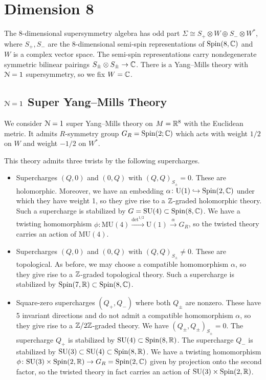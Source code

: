 \documentclass[10pt, oneside]{article}
\newcommand{\MU}{\mathrm{MU}}
\renewcommand{\U}{\mathrm{U}}
\begin{document}
\section{Dimension 8}

The 8-dimensional supersymmetry algebra has odd part $\Sigma\cong S_+\otimes W\oplus S_-\otimes W^*$, where $S_+, S_-$ are the 8-dimensional semi-spin representations of $\mathrm{Spin}(8, \mathbb C)$ and $W$ is a complex vector space. The semi-spin representations carry nondegenerate symmetric bilinear pairings $S_{\pm}\otimes S_{\pm}\rightarrow \mathbb C$. There is a Yang--Mills theory with $\mathcal{N}=1$ supersymmetry, so we fix $W = \mathbb C$.

\subsection{\texorpdfstring{$\mathcal N=1$}{N=1} Super Yang--Mills Theory}

We consider $\mathcal N=1$ super Yang--Mills theory on $M=\mathbb R^8$ with the Euclidean metric. It admits $R$-symmetry group $G_R=\mathrm{Spin}(2; \mathbb C)$ which acts with weight $1/2$ on $W$ and weight $-1/2$ on $W^*$.

This theory admits three twists by the following supercharges.
\begin{itemize}
\item Supercharges $(Q, 0)$ and $(0, Q)$ with $(Q, Q)_{S_\pm} = 0$. These are holomorphic. Moreover, we have an embedding $\alpha\colon \U(1)\hookrightarrow \Spin(2, \CC)$ under which they have weight 1, so they give rise to a $\mathbb Z$-graded holomorphic theory. Such a supercharge is stabilized by $G=\mathrm{SU}(4)\subset \mathrm{Spin}(8, \mathbb C)$. We have a twisting homomorphism $\phi\colon \MU(4)\xrightarrow{\det^{1/2}} \U(1)\xrightarrow{\alpha} G_R$, so the twisted theory carries an action of $\MU(4)$.

\item Supercharges $(Q, 0)$ and $(0, Q)$ with $(Q, Q)_{S_\pm}\neq 0$. These are topological. As before, we may choose a compatible homomorphism $\alpha$, so they give rise to a $\mathbb Z$-graded topological theory. Such a supercharge is stabilized by $\mathrm{Spin}(7, \mathbb R)\subset \mathrm{Spin}(8, \mathbb C)$.

\item Square-zero supercharges $(Q_+, Q_-)$ where both $Q_{\pm}$ are nonzero. These have 5 invariant directions and do not admit a compatible homomorphism $\alpha$, so they give rise to a $\mathbb Z/2\mathbb Z$-graded theory. We have $(Q_\pm, Q_\pm)_{S_\pm} = 0$. The supercharge $Q_+$ is stabilized by $\mathrm{SU}(4)\subset \mathrm{Spin}(8, \mathbb R)$. The supercharge $Q_-$ is stabilized by $\mathrm{SU}(3)\subset \mathrm{SU}(4)\subset \mathrm{Spin}(8, \mathbb R)$. We have a twisting homomorphism $\phi\colon \mathrm{SU}(3)\times \mathrm{Spin}(2, \mathbb R)\rightarrow G_R=\mathrm{Spin}(2, \mathbb C)$ given by projection onto the second factor, so the twisted theory in fact carries an action of $\mathrm{SU}(3)\times \mathrm{Spin}(2, \mathbb R)$.
\end{itemize}
\end{document}
